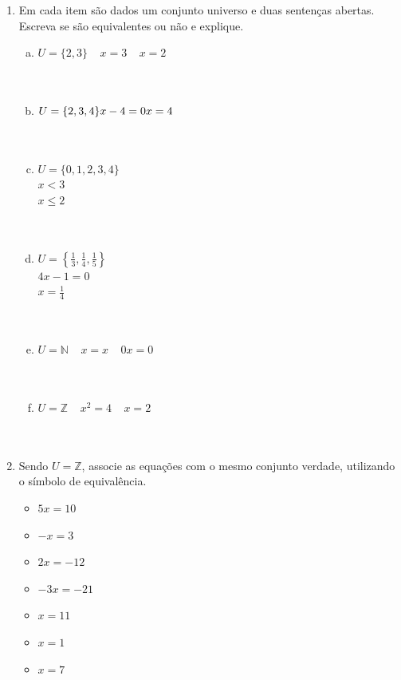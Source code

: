 \documentclass[a4paper,14pt]{article}
\begin{document}
\begin{multicols}{2}
\begin{enumerate}
    		\item Em cada item são dados um conjunto universo e duas sentenças abertas. Escreva se são equivalentes ou não e explique.
    		\begin{enumerate}[a)]
    			\item $U = \{2, 3\} ~~~~~ x = 3  ~~~~~ x = 2$ \\\\\\
    			\item $U = \{2, 3, 4\} \\ x - 4 = 0 \\ x = 4$ \\\\\\
    			\item $U = \{0, 1, 2, 3, 4\}$ \\ $x < 3$ \\ $x \leq 2$ \\\\\\
    			\item $U = \left \{ \frac{1}{3}, \frac{1}{4}, \frac{1}{5} \right \}$ \\ $4x - 1 = 0 $ \\ $x = \frac{1}{4}$ \\\\\\
    			\item $U = \mathbb{N} ~~~~~ x = x ~~~~~ 0x = 0$ \\\\\\
    			\item $U = \mathbb{Z} ~~~~~ x^2 = 4 ~~~~~ x = 2$ \\\\\\
    		\end{enumerate}
    	    \item Sendo $U = \mathbb{Z}$, associe as equações com o mesmo conjunto verdade, utilizando o símbolo de equivalência.
    	    \begin{itemize}
    	    	\item $5x = 10$
    	    	\item $-x = 3$
    	    	\item $2x = -12$
    	    	\item $-3x = -21$
    	    	\item $x = 11$
    	    	\item $x = 1$
    	    	\item $x = 7$

\end{itemize}
\end{enumerate}
\end{multicols}
\end{document}
